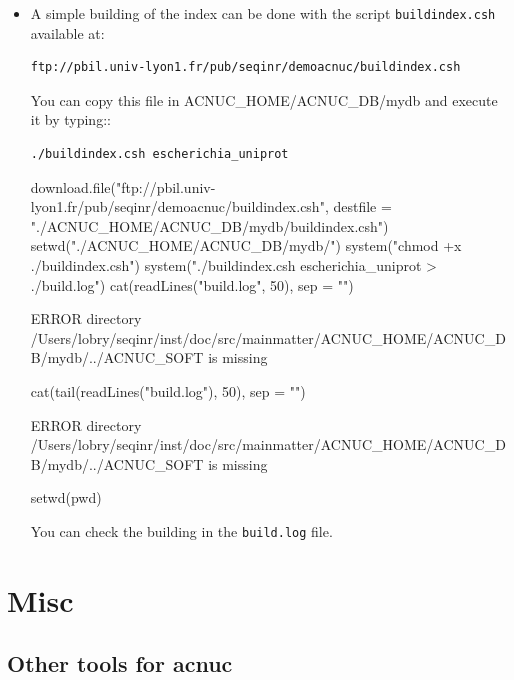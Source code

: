 \documentclass{article}
\begin{document}
\begin{itemize}
\item A simple building of the index can be done with the script  \texttt{buildindex.csh} available at:

\begin{verbatim}
ftp://pbil.univ-lyon1.fr/pub/seqinr/demoacnuc/buildindex.csh
\end{verbatim}


You can copy this file in ACNUC\_HOME/ACNUC\_DB/mydb and execute it by typing::

\begin{verbatim}
./buildindex.csh escherichia_uniprot
\end{verbatim}

\begin{Schunk}
\begin{Sinput}
 download.file("ftp://pbil.univ-lyon1.fr/pub/seqinr/demoacnuc/buildindex.csh", 
     destfile = "./ACNUC_HOME/ACNUC_DB/mydb/buildindex.csh")
 setwd("./ACNUC_HOME/ACNUC_DB/mydb/")
 system("chmod +x ./buildindex.csh")
 system("./buildindex.csh escherichia_uniprot >  ./build.log")
 cat(readLines("build.log", 50), sep = "\n")
\end{Sinput}
\begin{Soutput}
ERROR
directory /Users/lobry/seqinr/inst/doc/src/mainmatter/ACNUC_HOME/ACNUC_DB/mydb/../ACNUC_SOFT is missing
\end{Soutput}
\begin{Sinput}
 cat(tail(readLines("build.log"), 50), sep = "\n")
\end{Sinput}
\begin{Soutput}
ERROR
directory /Users/lobry/seqinr/inst/doc/src/mainmatter/ACNUC_HOME/ACNUC_DB/mydb/../ACNUC_SOFT is missing
\end{Soutput}
\begin{Sinput}
 setwd(pwd)
\end{Sinput}
\end{Schunk}
You can check the building in the \texttt{build.log} file.

\end{itemize}




\section{Misc} 

\subsection{Other tools for acnuc}
\end{document}
